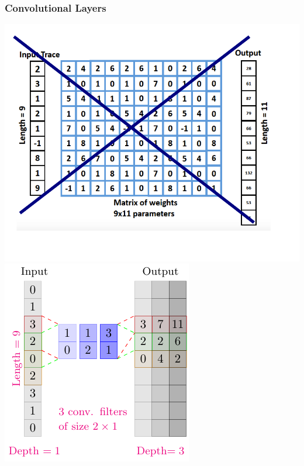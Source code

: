 \begin{frame}
\end{frame}

\begin{frame}
\frametitle{Convolutional Layers}
\includegraphics[width=.45\textwidth]{figures/FC_no.png} 
\includegraphics[width=.45\textwidth]{../tikz_per_manuscritto/conv_filter_2_1.pdf} 
\end{frame}

